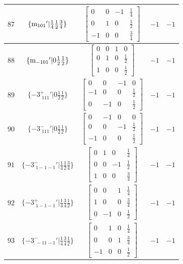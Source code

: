 \documentclass[fleqn,8pt]{jsarticle}
\begin{document}
\begin{longtable}{ccccc}
$ 87 $ & $ \{{\rm m}_{101}{}'|\frac{1}{4} \frac{1}{2} \frac{3}{4}\} $ & $ \begin{bmatrix} 0 & 0 & -1 & \frac{1}{4} \\ 0 & 1 & 0 & \frac{1}{2} \\ -1 & 0 & 0 & \frac{3}{4} \end{bmatrix} $ & $ -1 $ & $ -1 $ \\ \hline
$ 88 $ & $ \{{\rm m}_{-101}{}'|0 \frac{1}{2} \frac{1}{2}\} $ & $ \begin{bmatrix} 0 & 0 & 1 & 0 \\ 0 & 1 & 0 & \frac{1}{2} \\ 1 & 0 & 0 & \frac{1}{2} \end{bmatrix} $ & $ -1 $ & $ -1 $ \\ \hline
$ 89 $ & $ \{-3^{+}_{\,\,111}{}'|0 \frac{1}{2} \frac{1}{2}\} $ & $ \begin{bmatrix} 0 & 0 & -1 & 0 \\ -1 & 0 & 0 & \frac{1}{2} \\ 0 & -1 & 0 & \frac{1}{2} \end{bmatrix} $ & $ -1 $ & $ -1 $ \\ \hline
$ 90 $ & $ \{-3^{-}_{\,\,111}{}'|0 \frac{1}{2} \frac{1}{2}\} $ & $ \begin{bmatrix} 0 & -1 & 0 & 0 \\ 0 & 0 & -1 & \frac{1}{2} \\ -1 & 0 & 0 & \frac{1}{2} \end{bmatrix} $ & $ -1 $ & $ -1 $ \\ \hline
$ 91 $ & $ \{-3^{-}_{\,\,1-1-1}{}'|\frac{1}{4} \frac{1}{2} \frac{3}{4}\} $ & $ \begin{bmatrix} 0 & 1 & 0 & \frac{1}{4} \\ 0 & 0 & -1 & \frac{1}{2} \\ 1 & 0 & 0 & \frac{3}{4} \end{bmatrix} $ & $ -1 $ & $ -1 $ \\ \hline
$ 92 $ & $ \{-3^{+}_{\,\,1-1-1}{}'|\frac{1}{4} \frac{3}{4} \frac{1}{2}\} $ & $ \begin{bmatrix} 0 & 0 & 1 & \frac{1}{4} \\ 1 & 0 & 0 & \frac{3}{4} \\ 0 & -1 & 0 & \frac{1}{2} \end{bmatrix} $ & $ -1 $ & $ -1 $ \\ \hline
$ 93 $ & $ \{-3^{-}_{\,\,-11-1}{}'|\frac{1}{4} \frac{3}{4} \frac{1}{2}\} $ & $ \begin{bmatrix} 0 & 1 & 0 & \frac{1}{4} \\ 0 & 0 & 1 & \frac{3}{4} \\ -1 & 0 & 0 & \frac{1}{2} \end{bmatrix} $ & $ -1 $ & $ -1 $ \\ \hline

\end{longtable}
\end{document}
